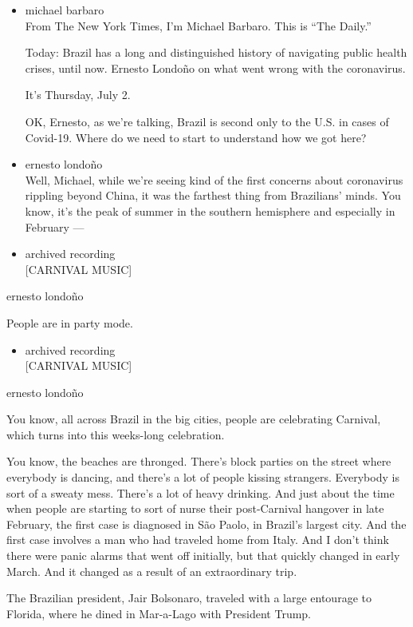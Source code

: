 \begin{itemize}
\item
  michael barbaro\\
  From The New York Times, I'm Michael Barbaro. This is ``The Daily.''

  Today: Brazil has a long and distinguished history of navigating
  public health crises, until now. Ernesto Londoño on what went wrong
  with the coronavirus.

  It's Thursday, July 2.

  OK, Ernesto, as we're talking, Brazil is second only to the U.S. in
  cases of Covid-19. Where do we need to start to understand how we got
  here?
\item
  ernesto londoño\\
  Well, Michael, while we're seeing kind of the first concerns about
  coronavirus rippling beyond China, it was the farthest thing from
  Brazilians' minds. You know, it's the peak of summer in the southern
  hemisphere and especially in February ---
\item
  archived recording\\
  {[}CARNIVAL MUSIC{]}
\end{itemize}

ernesto londoño

People are in party mode.

\begin{itemize}
\tightlist
\item
  archived recording\\
  {[}CARNIVAL MUSIC{]}
\end{itemize}

ernesto londoño

You know, all across Brazil in the big cities, people are celebrating
Carnival, which turns into this weeks-long celebration.

You know, the beaches are thronged. There's block parties on the street
where everybody is dancing, and there's a lot of people kissing
strangers. Everybody is sort of a sweaty mess. There's a lot of heavy
drinking. And just about the time when people are starting to sort of
nurse their post-Carnival hangover in late February, the first case is
diagnosed in São Paolo, in Brazil's largest city. And the first case
involves a man who had traveled home from Italy. And I don't think there
were panic alarms that went off initially, but that quickly changed in
early March. And it changed as a result of an extraordinary trip.

The Brazilian president, Jair Bolsonaro, traveled with a large entourage
to Florida, where he dined in Mar-a-Lago with President Trump.

